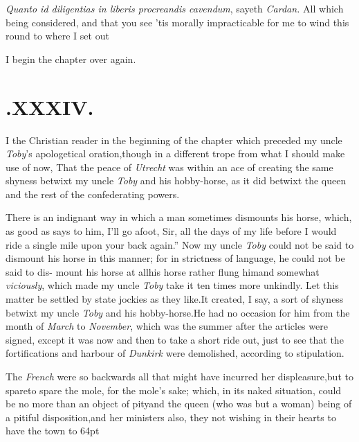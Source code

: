 \documentclass{article}
\begin{document}
\textit{Quanto id diligentias in liberis procreandis cavendum},
sayeth \textit{Cardan.} All which being considered, and that you see
’tis morally impracticable for me to wind this round to
where I set out\tsh

I begin the chapter over again.
\vfill{}\eject
\section{.\enspace XXXIV.}

\lettrine{I}{ } the Christian reader in the beginning of the chapter which
preceded my uncle \textit{Toby}’s apologetical oration,\tsk though in a different
trope from what I should make use of now, That the peace of \textit{Utrecht} was
within an ace of creating the same shyness betwixt my uncle \textit{Toby} and his
hobby-horse, as it did betwixt the queen and the rest of the confederating powers.

There is an indignant way in which a\break
man sometimes dismounts his horse,\break
which, as good as says to him, \lqq I’ll go\break
\lqq afoot, Sir, all the days of my life\break
\lqq before I would ride a single mile upon\break
\lqq your back again.” Now my uncle \textit{Toby} could not be
said to dismount his horse in this manner; for in strictness of language, he could
not be said to dis- mount his horse at all\tsh his horse rather flung him\tsh and
somewhat \textit{viciously}, which made my uncle \textit{Toby} take it ten times
more unkindly. Let this matter be settled by state jockies as they like.\tsh It
created, I say, a sort of shyness betwixt my uncle \textit{Toby} and his
hobby-horse.\tsh He had no occasion for him from the month of \textit{March} to
\textit{November}, which was the summer after the articles were signed, except it
was now and then to take a short ride out, just to see that the fortifications and
harbour of \textit{Dunkirk} were demolished, according to stipulation.

The \textit{French} were so backwards all that\break
{}
might have
incurred her displeasure,\tsk but to spare\tsk to spare the
mole, for the mole’s sake; which, in its naked situation,
could be no more than an object of pity\tsh and the queen
(who was but a woman) being of a pitiful
disposition,\tsk and her ministers also, they not wishing in
their hearts to have the town 
\stick{\astfill}
\hbox to 64pt{\astfill\tsh}
\end{document}
